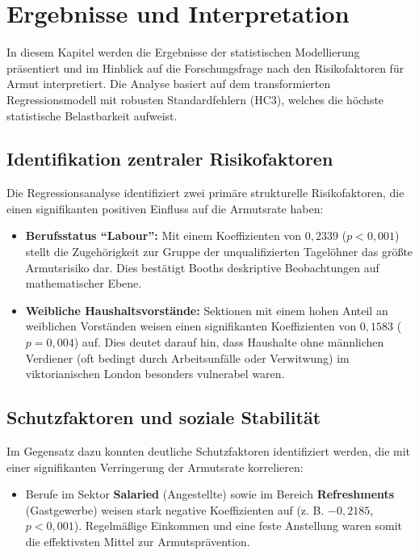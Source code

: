 \chapter{Ergebnisse und Interpretation}
\label{chap:ergebnisse}

In diesem Kapitel werden die Ergebnisse der statistischen Modellierung präsentiert und im Hinblick auf die Forschungsfrage nach den Risikofaktoren für Armut interpretiert. Die Analyse basiert auf dem transformierten Regressionsmodell mit robusten Standardfehlern (HC3), welches die höchste statistische Belastbarkeit aufweist.

\section*{Identifikation zentraler Risikofaktoren}
Die Regressionsanalyse identifiziert zwei primäre strukturelle Risikofaktoren, die einen signifikanten positiven Einfluss auf die Armutsrate haben:

\begin{itemize}
    \item \textbf{Berufsstatus "`Labour"':} Mit einem Koeffizienten von $0,2339$ ($p < 0,001$) stellt die Zugehörigkeit zur Gruppe der unqualifizierten Tagelöhner das größte Armutsrisiko dar. Dies bestätigt Booths deskriptive Beobachtungen auf mathematischer Ebene.
    \item \textbf{Weibliche Haushaltsvorstände:} Sektionen mit einem hohen Anteil an weiblichen Vorständen weisen einen signifikanten Koeffizienten von $0,1583$ ($p = 0,004$) auf. Dies deutet darauf hin, dass Haushalte ohne männlichen Verdiener (oft bedingt durch Arbeitsunfälle oder Verwitwung) im viktorianischen London besonders vulnerabel waren.
\end{itemize}

\section*{Schutzfaktoren und soziale Stabilität}
Im Gegensatz dazu konnten deutliche Schutzfaktoren identifiziert werden, die mit einer signifikanten Verringerung der Armutsrate korrelieren:
\begin{itemize}
    \item Berufe im Sektor \textbf{Salaried} (Angestellte) sowie im Bereich \textbf{Refreshments} (Gastgewerbe) weisen stark negative Koeffizienten auf (z. B. $-0,2185$, $p < 0,001$). Regelmäßige Einkommen und eine feste Anstellung waren somit die effektivsten Mittel zur Armutsprävention.
\end{itemize}

